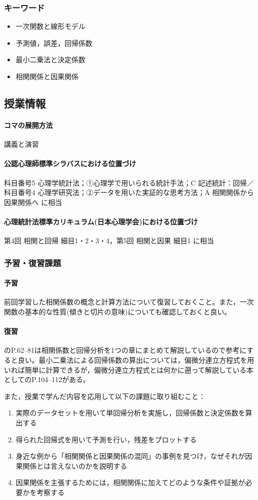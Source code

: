 \subsubsection{キーワード}
\begin{itemize}
	\item 一次関数と線形モデル
	\item 予測値，誤差，回帰係数
	\item 最小二乗法と決定係数
	\item 相関関係と因果関係
\end{itemize}
\subsection{授業情報}
\paragraph{コマの展開方法}
講義と演習
\paragraph{公認心理師標準シラバスにおける位置づけ}
科目番号5 心理学統計法；①心理学で用いられる統計手法；C 記述統計：回帰／科目番号4 心理学研究法；②データを用いた実証的な思考方法；A 相関関係から因果関係へ に相当
\paragraph{心理統計法標準カリキュラム(日本心理学会)における位置づけ}
第4回 相関と回帰 細目1・2・3・4，第5回 相関と因果 細目1 に相当
\subsubsection{予習・復習課題}
\paragraph{予習}
前回学習した相関係数の概念と計算方法について復習しておくこと。また，一次関数の基本的な性質(傾きと切片の意味)についても確認しておくと良い。
\paragraph{復習}
\textcite{Yamauchi201001}のP.62--81は相関係数と回帰分析を1つの章にまとめて解説しているので参考にすると良い。最小二乗法による回帰係数の算出については，偏微分連立方程式を用いれば簡単に計算できるが，偏微分連立方程式とは何かに遡って解説している本として\textcite{kosugi2018}のP.104--112がある。

また，授業で学んだ内容を応用して以下の課題に取り組むこと：
\begin{enumerate}
	\item 実際のデータセットを用いて単回帰分析を実施し，回帰係数と決定係数を算出する
	\item 得られた回帰式を用いて予測を行い，残差をプロットする
	\item 身近な例から「相関関係と因果関係の混同」の事例を見つけ，なぜそれが因果関係とは言えないのかを説明する
	\item 因果関係を主張するためには，相関関係に加えてどのような条件や証拠が必要かを考察する
\end{enumerate}
